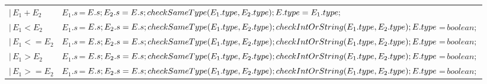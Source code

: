 \documentclass[11pt, oneside]{article}
\begin{document}
\begin{tabularx}{\textwidth}{ |X|X| }
	   $| \, E_1+E_2 $ & $E_1.s \, $=$\, E.s; E_2.s = E.s; \, \newline checkSameType(E_1.type, E_2.type); E.type = E_1.type; $ \\	
	   $| \, E_1<E_2 $ & $E_1.s \, $=$\, E.s; E_2.s = E.s; \, \newline checkSameType(E_1.type, E_2.type); \newline checkIntOrString(E_1.type, E_2.type); E.type\,$=$\,boolean; $ \\
	   $| \, E_1<=E_2 $ & $E_1.s \, $=$\, E.s; E_2.s = E.s; \, \newline checkSameType(E_1.type, E_2.type); \newline checkIntOrString(E_1.type, E_2.type); E.type\,$=$\,boolean; $ \\
	   $| \, E_1>E_2 $ & $E_1.s \, $=$\, E.s; E_2.s = E.s; \, \newline checkSameType(E_1.type, E_2.type); \newline checkIntOrString(E_1.type, E_2.type); E.type\,$=$\,boolean; $ \\
	   $| \, E_1>=E_2 $ & $E_1.s \, $=$\, E.s; E_2.s = E.s; \, \newline checkSameType(E_1.type, E_2.type); \newline checkIntOrString(E_1.type, E_2.type); E.type\,$=$\,boolean; $ \\
	   	   
\hline
\end{tabularx}	   
	   
\end{document}
